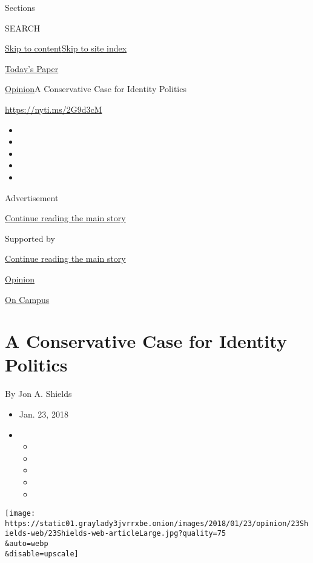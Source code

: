 Sections

SEARCH

\protect\hyperlink{site-content}{Skip to
content}\protect\hyperlink{site-index}{Skip to site index}

\href{https://myaccount.nytimes3xbfgragh.onion/auth/login?response_type=cookie\&client_id=vi}{}

\href{https://www.nytimes3xbfgragh.onion/section/todayspaper}{Today's
Paper}

\href{/section/opinion}{Opinion}\textbar{}A Conservative Case for
Identity Politics

\url{https://nyti.ms/2G9d3cM}

\begin{itemize}
\item
\item
\item
\item
\item
\end{itemize}

Advertisement

\protect\hyperlink{after-top}{Continue reading the main story}

Supported by

\protect\hyperlink{after-sponsor}{Continue reading the main story}

\href{/section/opinion}{Opinion}

\href{/column/on-campus}{On Campus}

\hypertarget{a-conservative-case-for-identity-politics}{%
\section{A Conservative Case for Identity
Politics}\label{a-conservative-case-for-identity-politics}}

By Jon A. Shields

\begin{itemize}
\item
  Jan. 23, 2018
\item
  \begin{itemize}
  \item
  \item
  \item
  \item
  \item
  \end{itemize}
\end{itemize}

\texttt{[image: https://static01.graylady3jvrrxbe.onion/images/2018/01/23/opinion/23Shields-web/23Shields-web-articleLarge.jpg?quality=75\\\&auto=webp\\\&disable=upscale]}

